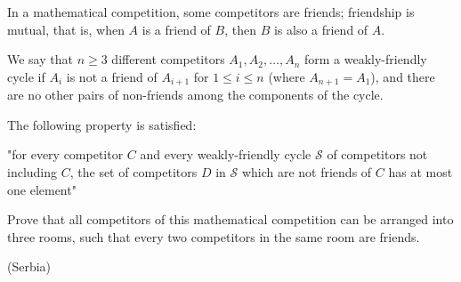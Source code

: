 In a mathematical competition, some competitors are friends; friendship is mutual, that is, when $A$ is a friend of $B$,  then $B$ is also a friend of $A$.

We say that $n \geq 3$ different competitors $A_1, A_2, \ldots, A_n$ form a weakly-friendly cycle if $A_i$ is not a friend of $A_{i+1}$ for $1 \leq i \leq n$ (where $A_{n+1} = A_1$), and there are no other pairs of non-friends among the components of the cycle.

The following property is satisfied:

"for every competitor $C$ and every weakly-friendly cycle $\mathcal{S}$ of competitors not including $C$,  the set of competitors $D$ in $\mathcal{S}$ which are not friends of $C$ has at most one element"

Prove that all competitors of this mathematical competition can be arranged into three rooms, such that every two competitors in the same room are friends.

(Serbia)